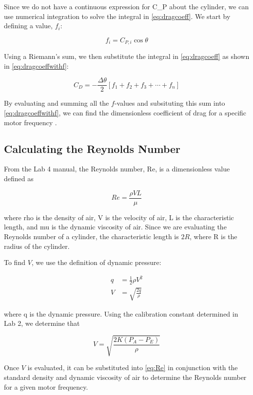 Since we do not have a continuous expression for \gls{C_P} about the cylinder, we can use numerical integration to solve the integral in \autoref{eq:dragcoeff}. We start by defining a value, $f_i$:

\begin{equation}\label{eq:f_i}
    f_i = C_{P,i}\cos{\theta}
\end{equation}

\noindent{}Using a Riemann's sum, we then substitute the integral in \autoref{eq:dragcoeff} as shown in \autoref{eq:dragcoeffwithf}:

\begin{equation}\label{eq:dragcoeffwithf}
    C_D = -\frac{\Delta\theta}{2}\left[f_1 + f_2 + f_3 + \cdots + f_n\right]
\end{equation}

\noindent{}By evaluating and summing all the $f$-values and subsituting this sum into \autoref{eq:dragcoeffwithf}, we can find the dimensionless coefficient of drag for a specific motor frequency \citep{lab4-manual}.

\subsection{Calculating the Reynolds Number}

From the Lab \num{4} manual, the Reynolds number, \gls{Re}, is a dimensionless value defined as

\begin{equation}\label{eq:Re}
    Re = \frac{\rho V L}{\mu}
\end{equation}

\noindent{}where \gls{rho} is the density of air, \gls{V} is the velocity of air, \gls{L} is the characteristic length, and \gls{mu} is the dynamic viscosity of air. Since we are evaluating the Reynolds number of a cylinder, the characteristic length is $2R$, where \gls{R} is the radius of the cylinder.

To find $V$, we use the definition of dynamic pressure:

\begin{align}
    q &= \frac{1}{2}\rho V^2\nonumber \\
    V &= \sqrt{\frac{2q}{\rho}}\label{eq:V}
\end{align}

\noindent{}where \gls{q} is the dynamic pressure. Using the calibration constant determined in Lab \num{2}, we determine that

\begin{equation}
    V = \sqrt{\frac{2K(P_A - P_E)}{\rho}}
\end{equation}

Once $V$ is evaluated, it can be substituted into \autoref{eq:Re} in conjunction with the standard density and dynamic viscosity of air to determine the Reynolds number for a given motor frequency.
